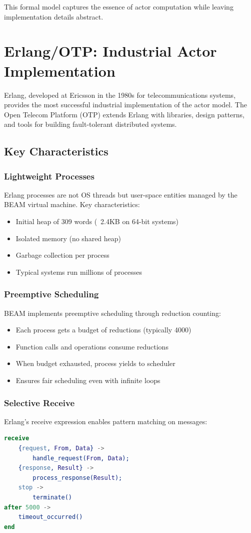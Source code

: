 \documentclass[12pt,a4paper]{report}
\begin{document}
This formal model captures the essence of actor computation while leaving implementation details abstract.

\section{Erlang/OTP: Industrial Actor Implementation}

Erlang, developed at Ericsson in the 1980s for telecommunications systems, provides the most successful industrial implementation of the actor model. The Open Telecom Platform (OTP) extends Erlang with libraries, design patterns, and tools for building fault-tolerant distributed systems.

\subsection{Key Characteristics}

\subsubsection{Lightweight Processes}
Erlang processes are not OS threads but user-space entities managed by the BEAM virtual machine. Key characteristics:
\begin{itemize}
\item Initial heap of 309 words (~2.4KB on 64-bit systems)
\item Isolated memory (no shared heap)
\item Garbage collection per process
\item Typical systems run millions of processes
\end{itemize}

\subsubsection{Preemptive Scheduling}
BEAM implements preemptive scheduling through reduction counting:
\begin{itemize}
\item Each process gets a budget of reductions (typically 4000)
\item Function calls and operations consume reductions
\item When budget exhausted, process yields to scheduler
\item Ensures fair scheduling even with infinite loops
\end{itemize}

\subsubsection{Selective Receive}
Erlang's receive expression enables pattern matching on messages:
\begin{lstlisting}[language=Erlang]
receive
    {request, From, Data} ->
        handle_request(From, Data);
    {response, Result} ->
        process_response(Result);
    stop ->
        terminate()
after 5000 ->
    timeout_occurred()
end
\end{lstlisting}
\end{document}
